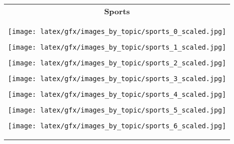 \begin{table*}[ht]
\begin{tabular}{c}
            \textbf{Sports}  \\ \cmidrule(lr){1-1}
                    \begin{minipage}{0.08\textwidth}
                        \centering
                        \texttt{[image: latex/gfx/images\_by\_topic/sports\_0\_scaled.jpg]}
                    \end{minipage}
                    \hfill
                    \begin{minipage}{0.08\textwidth}
                        \centering
                        \texttt{[image: latex/gfx/images\_by\_topic/sports\_1\_scaled.jpg]}
                    \end{minipage}
                    \hfill
                    \begin{minipage}{0.08\textwidth}
                        \centering
                        \texttt{[image: latex/gfx/images\_by\_topic/sports\_2\_scaled.jpg]}
                    \end{minipage}
                    \hfill
                    \begin{minipage}{0.08\textwidth}
                        \centering
                        \texttt{[image: latex/gfx/images\_by\_topic/sports\_3\_scaled.jpg]}
                    \end{minipage}
                    \hfill
                    \begin{minipage}{0.08\textwidth}
                        \centering
                        \texttt{[image: latex/gfx/images\_by\_topic/sports\_4\_scaled.jpg]}
                    \end{minipage}
                    \hfill
                    \begin{minipage}{0.08\textwidth}
                        \centering
                        \texttt{[image: latex/gfx/images\_by\_topic/sports\_5\_scaled.jpg]}
                    \end{minipage}
                    \hfill
                    \begin{minipage}{0.08\textwidth}
                        \centering
                        \texttt{[image: latex/gfx/images\_by\_topic/sports\_6\_scaled.jpg]}
                    \end{minipage}
                    \hfill
                    \begin{minipage}{0.08\textwidth}

\end{minipage}
\end{tabular}
\end{table*}
